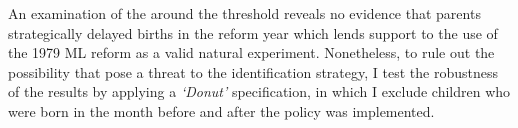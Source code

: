\label{rev_mlch: editor_selective_delivery}
 An examination of the  around the threshold reveals no evidence that parents strategically delayed births in the reform year which lends support to the use of the 1979 ML reform as a valid natural experiment. Nonetheless, to rule out the possibility that  pose a threat to the identification strategy, I test the robustness of the results by applying a \textit{`Donut'} specification, in which I exclude children who were born in the month before and after the policy was implemented.
 


	















